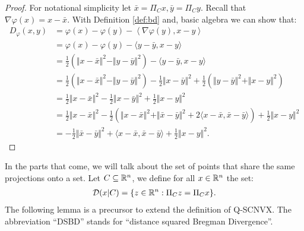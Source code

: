\documentclass[12pt]{article}
\begin{document}
    \begin{proof}
        For notational simplicity let $\bar x = \Pi_C x, \bar y = \Pi_C y$. 
        Recall that $\nabla \varphi (x) = x - \bar x$. 
        With Definition \ref{def:bd} and, basic algebra we can show that: 
        \begin{align*}
            D_{\varphi}(x, y) &= 
            \varphi(x) - \varphi(y) - \left\langle \nabla \varphi(y), x - y\right\rangle
            \\
            &= \varphi(x) - \varphi(y) - \langle y - \bar y, x - y\rangle
            \\
            &= \frac{1}{2}(\Vert x - \bar x\Vert^2 - \Vert y - \bar y\Vert^2)
            - \langle y - \bar y, x - y\rangle
            \\
            &= \frac{1}{2}(\Vert x - \bar x\Vert^2 - \Vert y - \bar y\Vert^2)
            - \frac{1}{2}\Vert x - \bar y\Vert^2 
            + \frac{1}{2}\left(
                \Vert y - \bar y\Vert^2 + \Vert x - y\Vert^2
            \right)
            \\ 
            &= \frac{1}{2}\Vert x - \bar x\Vert^2
            - \frac{1}{2}\Vert x - \bar y\Vert^2 + \frac{1}{2}\Vert x - y\Vert^2
            \\
            &= 
            \frac{1}{2}\Vert x - \bar x\Vert^2
            - \frac{1}{2}\left(
                \Vert x - \bar x\Vert^2 + \Vert \bar x - \bar y\Vert^2
                + 2\langle x - \bar x, \bar x - \bar y\rangle
            \right)
            + \frac{1}{2}\Vert x - y\Vert^2
            \\
            &= - \frac{1}{2}\Vert \bar x - \bar y\Vert^2 + \langle x - \bar x, \bar x - \bar y\rangle 
            + \frac{1}{2}\Vert x - y \Vert^2. 
        \end{align*}
    \end{proof}
    \par
    In the parts that come, we will talk about the set of points that share the same projections onto a set.
    Let $C \subseteq \mathbb R^n$, we define for all $x \in \mathbb R^n$ the set: 
    \begin{align}
        \mathcal D(x | C) = \{z \in \mathbb R^n : \Pi_C z = \Pi_C x\}. 
    \end{align}
    The following lemma is a precursor to extend the definition of Q-SCNVX. 
    The abbreviation ``DSBD'' stands for ``distance squared Bregman Divergence''. 
\end{document}

